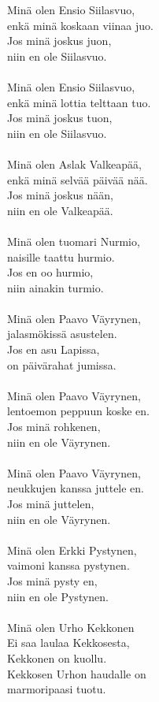 
Minä olen Ensio Siilasvuo, \\ enkä minä koskaan viinaa juo. \\ Jos minä joskus juon, \\ niin en ole Siilasvuo. \\ \hspace{10mm} \\ Minä olen Ensio Siilasvuo, \\ enkä minä lottia telttaan tuo. \\ Jos minä joskus tuon, \\ niin en ole Siilasvuo. \\ \hspace{10mm} \\ Minä olen Aslak Valkeapää, \\ enkä minä selvää päivää nää. \\ Jos minä joskus nään, \\ niin en ole Valkeapää. \\ \hspace{10mm} \\ Minä olen tuomari Nurmio, \\ naisille taattu hurmio. \\ Jos en oo hurmio, \\ niin ainakin turmio. \\ \hspace{10mm} \\ Minä olen Paavo Väyrynen, \\ jalasmökissä asustelen. \\ Jos en asu Lapissa, \\ on päivärahat jumissa. \\ \hspace{10mm} \\ Minä olen Paavo Väyrynen, \\ lentoemon peppuun koske en. \\ Jos minä rohkenen, \\ niin en ole Väyrynen. \\ \hspace{10mm} \\ Minä olen Paavo Väyrynen, \\ neukkujen kanssa juttele en. \\ Jos minä juttelen, \\ niin en ole Väyrynen. \\ \hspace{10mm} \\ Minä olen Erkki Pystynen, \\ vaimoni kanssa pystynen. \\ Jos minä pysty en, \\ niin en ole Pystynen. \\ \hspace{10mm} \\ Minä olen Urho Kekkonen \\ Ei saa laulaa Kekkosesta, \\ Kekkonen on kuollu. \\ Kekkosen Urhon haudalle on \\ marmoripaasi tuotu.